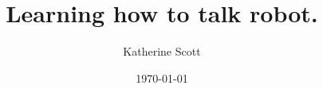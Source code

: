 \documentclass[compress]{beamer}
\title[RobotWords]{Learning how to talk robot.} %
\author{Katherine Scott} %
\institute[Computer Vision Engineer] %
{
Computer Vision Engineer
\medskip
\textit{katherine.a.scott@gmail.com}
\textit{http://www.kscottz.com}
}
\date{\today} %
\begin{document}
\begin{frame}
\titlepage %
\end{frame}



\end{document}
